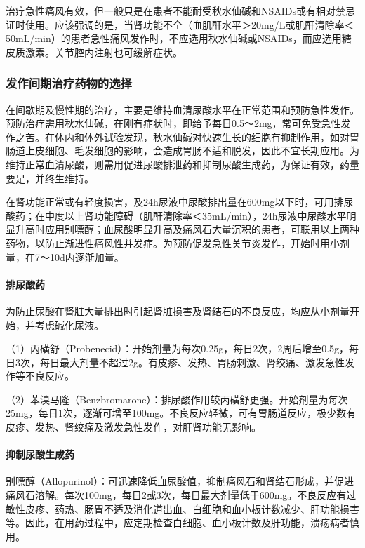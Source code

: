 治疗急性痛风有效，但一般只是在患者不能耐受秋水仙碱和NSAIDs或有相对禁忌证时使用。应该强调的是，当肾功能不全（血肌酐水平＞20mg/L或肌酐清除率＜50mL/min）的患者急性痛风发作时，不应选用秋水仙碱或NSAIDs，而应选用糖皮质激素。关节腔内注射也可缓解症状。

\subsubsection{发作间期治疗药物的选择}

在间歇期及慢性期的治疗，主要是维持血清尿酸水平在正常范围和预防急性发作。预防治疗需用秋水仙碱，在刚有症状时，即给予每日0.5～2mg，常可免受急性发作之苦。在体内和体外试验发现，秋水仙碱对快速生长的细胞有抑制作用，如对胃肠道上皮细胞、毛发细胞的影响，会造成胃肠不适和脱发，因此不宜长期应用。为维持正常血清尿酸，则需用促进尿酸排泄药和抑制尿酸生成药，为保证有效，药量要足，并终生维持。

在肾功能正常或有轻度损害，及24h尿液中尿酸排出量在600mg以下时，可用排尿酸药；在中度以上肾功能障碍（肌酐清除率＜35mL/min），24h尿液中尿酸水平明显升高时应用别嘌醇；血尿酸明显升高及痛风石大量沉积的患者，可联用以上两种药物，以防止渐进性痛风性并发症。为预防促发急性关节炎发作，开始时用小剂量，在7～10d内逐渐加量。
\paragraph{排尿酸药}

为防止尿酸在肾脏大量排出时引起肾脏损害及肾结石的不良反应，均应从小剂量开始，并考虑碱化尿液。

（1）丙磺舒（Probenecid）：开始剂量为每次0.25g，每日2次，2周后增至0.5g，每日3次，每日最大剂量不超过2g。有皮疹、发热、胃肠刺激、肾绞痛、激发急性发作等不良反应。

（2）苯溴马隆（Benzbromarone）：排尿酸作用较丙磺舒更强。开始剂量为每次25mg，每日1次，逐渐可增至100mg。不良反应轻微，可有胃肠道反应，极少数有皮疹、发热、肾绞痛及激发急性发作，对肝肾功能无影响。
\paragraph{抑制尿酸生成药}

别嘌醇（Allopurinol）：可迅速降低血尿酸值，抑制痛风石和肾结石形成，并促进痛风石溶解。每次100mg，每日2或3次，每日最大剂量低于600mg。不良反应有过敏性皮疹、药热、肠胃不适及消化道出血、白细胞和血小板计数减少、肝功能损害等。因此，在用药过程中，应定期检查白细胞、血小板计数及肝功能，溃疡病者慎用。